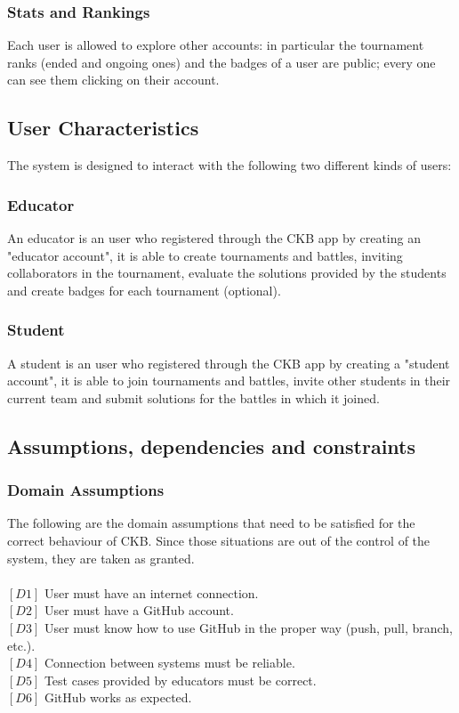 \documentclass{article}
\begin{document}
\subsubsection{Stats and Rankings}
Each user is allowed to explore other accounts: in particular the tournament ranks (ended and ongoing ones) and the badges of a user are public; every one can see them clicking on their account.

\subsection{User Characteristics}
The system is designed to interact with the following two different kinds of users:
\subsubsection{Educator}
An educator is an user who registered through the CKB app by creating an "educator account", it is able to create tournaments and battles, inviting collaborators in the tournament, evaluate the solutions provided by the students and create badges for each tournament (optional).
\subsubsection{Student}
A student is an user who registered through the CKB app by creating a "student account", it is able to join tournaments and battles, invite other students in their current team and submit solutions for the battles in which it joined.
\subsection{Assumptions, dependencies and constraints}

\subsubsection{Domain Assumptions}
The following are the domain assumptions that need to be satisfied for the correct behaviour of CKB. Since those situations are out of the control of the system, they are taken as granted.\\\\
$[D1]$ User must have an internet connection.\\
$[D2]$ User must have a GitHub account.\\
$[D3]$ User must know how to use GitHub in the proper way (push, pull, branch, etc.).\\
$[D4]$ Connection between systems must be reliable.\\
$[D5]$ Test cases provided by educators must be correct.\\
$[D6]$ GitHub works as expected.\\
\end{document}
